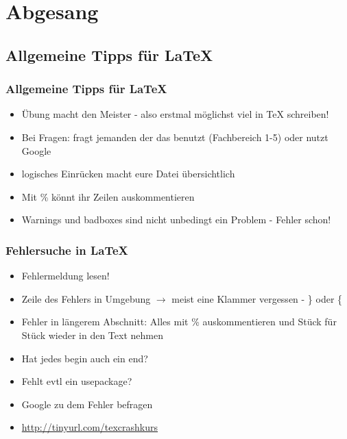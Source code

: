 \documentclass{beamer}
\begin{document}
\section{Abgesang}
\subsection{Allgemeine Tipps für LaTeX}
\begin{frame}
\frametitle{Allgemeine Tipps für \LaTeX}
  \begin{itemize}
    \item<1-> Übung macht den Meister - also erstmal möglichst viel in TeX schreiben!
    \item<2-> Bei Fragen: fragt jemanden der das benutzt (Fachbereich 1-5) oder nutzt Google
    \item<3-> logisches Einrücken macht eure Datei übersichtlich
    \item<4-> Mit \% könnt ihr Zeilen auskommentieren
    \item<5-> Warnings und badboxes sind nicht unbedingt ein Problem - Fehler schon!
  \end{itemize}
\end{frame}

\begin{frame}
\frametitle{Fehlersuche in \LaTeX}
  \begin{itemize}
    \item<1-> Fehlermeldung lesen!
    \item<2-> Zeile des Fehlers in Umgebung $\rightarrow$ meist eine Klammer vergessen - \} oder \{
    \item<3-> Fehler in längerem Abschnitt: Alles mit \% auskommentieren und Stück für Stück wieder in den Text nehmen
    \item<4-> Hat jedes \alert<4>{begin} auch ein \alert<4>{end}?
    \item<5-> Fehlt evtl ein \alert<5>{usepackage}?
    \item<6-> Google zu dem Fehler befragen
    \item<7-> \url{http://tinyurl.com/texcrashkurs}
  \end{itemize}
\end{frame}



\begin{frame}
 \begin{center}
  \Large {} \\
 \end{center}
\end{frame}
\end{document}

